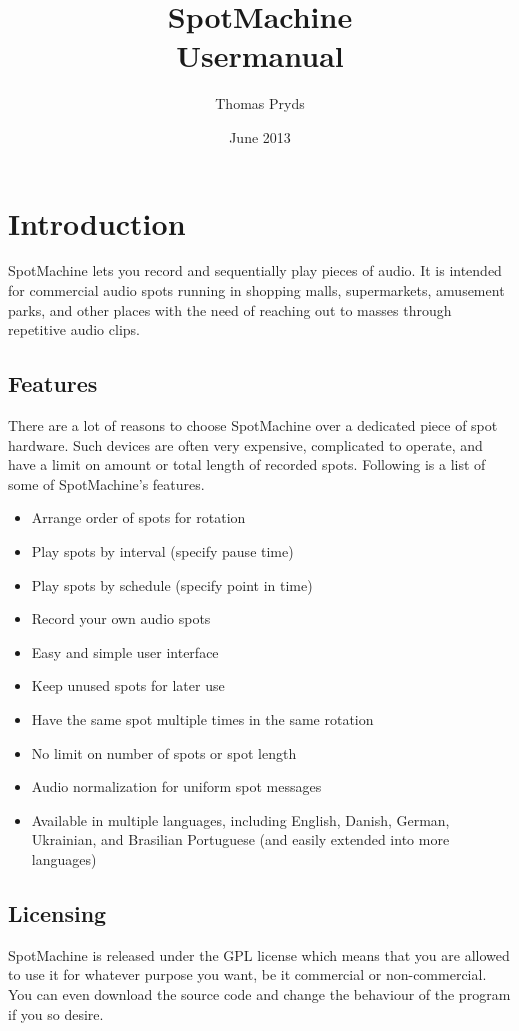 \documentclass[a4paper,12pt]{report}
\title{SpotMachine \\ Usermanual}
\author{Thomas Pryds}
\date{June 2013}
\begin{document}
\maketitle

\tableofcontents

\chapter{Introduction}

SpotMachine lets you record and sequentially play pieces of audio. It is
intended for commercial audio spots running in shopping malls, supermarkets,
amusement parks, and other places with the need of reaching out to masses
through repetitive audio clips.

\section{Features}
There are a lot of reasons to choose SpotMachine over a dedicated piece of spot
hardware. Such devices are often very expensive, complicated to operate, and
have a limit on amount or total length of recorded spots. Following is a list of
some of SpotMachine's features.

\begin{itemize}
\item Arrange order of spots for rotation
\item Play spots by interval (specify pause time)
\item Play spots by schedule (specify point in time)
\item Record your own audio spots
\item Easy and simple user interface
\item Keep unused spots for later use
\item Have the same spot multiple times in the same rotation
\item No limit on number of spots or spot length
\item Audio normalization for uniform spot messages
\item Available in multiple languages, including English, Danish, German, Ukrainian, and Brasilian Portuguese (and easily extended into more languages)
\end{itemize}

\section{Licensing}
SpotMachine is released under the GPL license which means that you are allowed
to use it for whatever purpose you want, be it commercial or non-commercial. You
can even download the source code and change the behaviour of the program if you
so desire.
\end{document}

